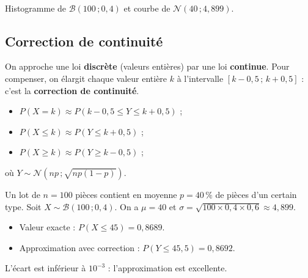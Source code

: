 \documentclass[a4paper,11pt]{article}
\begin{document}
\begin{center}
\\
{\footnotesize\color{uimmgray} Histogramme de $\mathcal{B}(100\,;0{,}4)$ et courbe de $\mathcal{N}(40\,;4{,}899)$.}
\end{center}

\subsection{Correction de continuité}

On approche une loi \textbf{discrète} (valeurs entières) par une loi \textbf{continue}. Pour compenser, on élargit chaque valeur entière $k$ à l'intervalle $[k-0{,}5\,;\,k+0{,}5]$ : c'est la \textbf{correction de continuité}.

\begin{methode}
\begin{itemize}
  \item $P(X = k) \approx P(k - 0{,}5 \leq Y \leq k + 0{,}5)$ ;
  \item $P(X \leq k) \approx P(Y \leq k + 0{,}5)$ ;
  \item $P(X \geq k) \approx P(Y \geq k - 0{,}5)$ ;
\end{itemize}
où $Y \sim \mathcal{N}(np\,;\sqrt{np(1-p)})$.
\end{methode}

\begin{exemple}
Un lot de $n = 100$ pièces contient en moyenne $p = 40\,\%$ de pièces d'un certain type. Soit $X \sim \mathcal{B}(100\,;0{,}4)$. On a $\mu = 40$ et $\sigma = \sqrt{100 \times 0{,}4 \times 0{,}6} \approx 4{,}899$.
\begin{itemize}
  \item Valeur exacte : $P(X \leq 45) = 0{,}8689$.
  \item Approximation avec correction : $P(Y \leq 45{,}5) = 0{,}8692$.
\end{itemize}
L'écart est inférieur à $10^{-3}$ : l'approximation est excellente.
\end{exemple}
\end{document}
